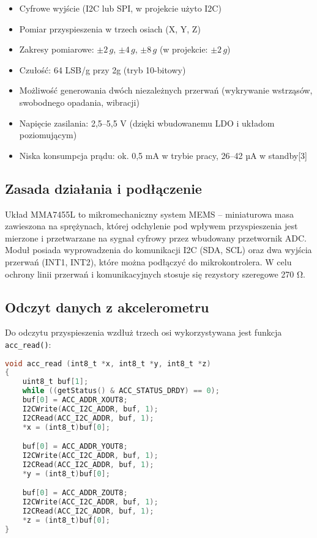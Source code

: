 \documentclass[a4paper,12pt]{report}
\begin{document}
\begin{itemize}
    \item Cyfrowe wyjście (I2C lub SPI, w projekcie użyto I2C)
    \item Pomiar przyspieszenia w trzech osiach (X, Y, Z)
    \item Zakresy pomiarowe: \(\pm2\,g\), \(\pm4\,g\), \(\pm8\,g\) (w projekcie: \(\pm2\,g\))
    \item Czułość: 64 LSB/g przy 2g (tryb 10-bitowy)
    \item Możliwość generowania dwóch niezależnych przerwań (wykrywanie wstrząsów, swobodnego opadania, wibracji)
    \item Napięcie zasilania: 2,5–5,5 V (dzięki wbudowanemu LDO i układom poziomującym)
    \item Niska konsumpcja prądu: ok. 0,5 mA w trybie pracy, 26–42 µA w standby[3]
\end{itemize}

\subsection*{Zasada działania i podłączenie}

Układ MMA7455L to mikromechaniczny system MEMS – miniaturowa masa zawieszona na sprężynach, której odchylenie pod wpływem przyspieszenia jest mierzone i przetwarzane na sygnał cyfrowy przez wbudowany przetwornik ADC. Moduł posiada wyprowadzenia do komunikacji I2C (SDA, SCL) oraz dwa wyjścia przerwań (INT1, INT2), które można podłączyć do mikrokontrolera. W celu ochrony linii przerwań i komunikacyjnych stosuje się rezystory szeregowe 270 \si{\ohm}.

\subsection*{Odczyt danych z akcelerometru}

Do odczytu przyspieszenia wzdłuż trzech osi wykorzystywana jest funkcja \texttt{acc\_read()}:

\begin{lstlisting}[language=C]
void acc_read (int8_t *x, int8_t *y, int8_t *z)
{
    uint8_t buf[1];
    while ((getStatus() & ACC_STATUS_DRDY) == 0);
    buf[0] = ACC_ADDR_XOUT8;
    I2CWrite(ACC_I2C_ADDR, buf, 1);
    I2CRead(ACC_I2C_ADDR, buf, 1);
    *x = (int8_t)buf[0];

    buf[0] = ACC_ADDR_YOUT8;
    I2CWrite(ACC_I2C_ADDR, buf, 1);
    I2CRead(ACC_I2C_ADDR, buf, 1);
    *y = (int8_t)buf[0];

    buf[0] = ACC_ADDR_ZOUT8;
    I2CWrite(ACC_I2C_ADDR, buf, 1);
    I2CRead(ACC_I2C_ADDR, buf, 1);
    *z = (int8_t)buf[0];
}
\end{lstlisting}
\end{document}
